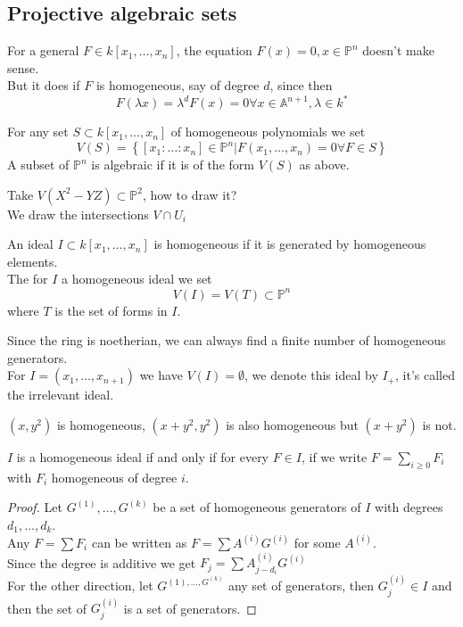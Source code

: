 \documentclass[../main.tex]{subfiles}
\begin{document}
\subsection{Projective algebraic sets}
For a general $ F\in k[x_1,\ldots,x_n]$, the equation $F( x) =0, x\in \mathbb{P}^{n}$ doesn't make sense.\\
But it does if $F$ is homogeneous, say of degree $d$, since then
\[ 
F( \lambda x ) = \lambda^{d} F( x) =0 \forall x \in \mathbb{A}^{n+1},\lambda\in k^{*}
\]
\begin{defn}
	For any set $ S \subset k[x_1,\ldots,x_n]$ of homogeneous polynomials we set
	\[ 
	V( S) = \left\{ [ x_1:\ldots:x_n] \in \mathbb{P}^{n}| F( x_1,\ldots,x_n) =0\forall F\in S \right\} 
	\]
	A subset of $ \mathbb{P}^{n}$ is algebraic if it is of the form $V( S) $ as above.
\end{defn}
\begin{exemple}
Take $V( X^{2}-YZ) \subset \mathbb{P}^{2} $, how to draw it?\\
We draw the intersections $V\cap U_i$ 	
\end{exemple}
\begin{defn}
	An ideal $I \subset k[x_1,\ldots,x_n]$ is homogeneous if it is generated by homogeneous elements.\\
	The for $I$ a homogeneous ideal we set
	\[ 
	V( I) = V( T) \subset \mathbb{P}^{n}
	\]
	where $T$ is the set of forms in $I$.
\end{defn}
\begin{rmq}
Since the ring is noetherian, we can always find a finite number of homogeneous generators.\\
For $I = ( x_1,\ldots,x_{n+1} ) $ we have $V( I) = \emptyset$, we denote this ideal by $I_+$, it's called the irrelevant ideal.
\end{rmq}
\begin{exemple}
$( x,y^{2}) $ is homogeneous, $ ( x+y^{2},y^{2}) $ is also homogeneous but $( x+y^{2}) $ is not.
\end{exemple}
\begin{lemma}
	$I$ is a homogeneous ideal if and only if for every $F \in I$, if we write $F = \sum_{i \geq 0} F_i$ with $F_i$ homogeneous of degree $i$.
\end{lemma}
\begin{proof}
Let $ G^{( 1) },\ldots,G^{( k) }$ be a set of homogeneous generators of $I$ with degrees $d_1,\ldots,d_k$.\\
Any $ F= \sum F_i$ can be written as $ F = \sum A^{( i) }G^{( i) }$ for some $A^{( i) }$.\\
Since the degree is additive we get $F_j = \sum A^{( i) }_{j-d_i} G^{ ( i) }$ \\
For the other direction, let $G^{( 1) ,\ldots,G^{( k) }}$ any set of generators, then $G_j^{( i) }\in I$ and then the set of $G_j^{( i) }$ is a set of generators.
\end{proof}
\end{document}
